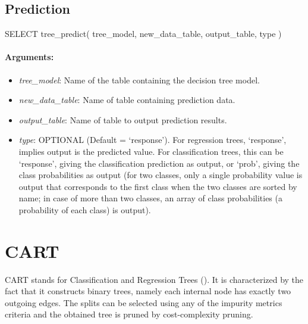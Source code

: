 \subsection{Prediction} %
\label{sub:prediction}
\begin{sql}
    SELECT tree_predict(
            tree_model,
            new_data_table,
            output_table,
            type
    )
\end{sql}

\paragraph{Arguments:}

\begin{itemize}
    \item \emph{tree\_model}: Name of the table containing the decision tree model.
    \item \emph{new\_data\_table}: Name of table containing prediction data.
    \item \emph{output\_table}: Name of table to output prediction results.
    \item \emph{type}: OPTIONAL (Default = `response'). For regression trees,
    `response', implies output is the predicted value. For classification trees,
    this can be `response', giving the classification prediction as output, or
    `prob', giving the class probabilities as output
    (for two classes, only a single probability value is output that corresponds
    to the first class when the two classes are sorted by name;
    in case of more than two classes, an array of class probabilities
    (a probability of each class) is output).
\end{itemize}
\section{CART} %
\label{sec:cart}
CART stands for Classification and Regression Trees (\cite{breiman1984cart}). It
is characterized by the fact that it constructs binary trees, namely each
internal node has exactly two outgoing edges. The splits can be selected using
any of the impurity metrics criteria and the obtained tree is pruned by
cost-complexity pruning.

